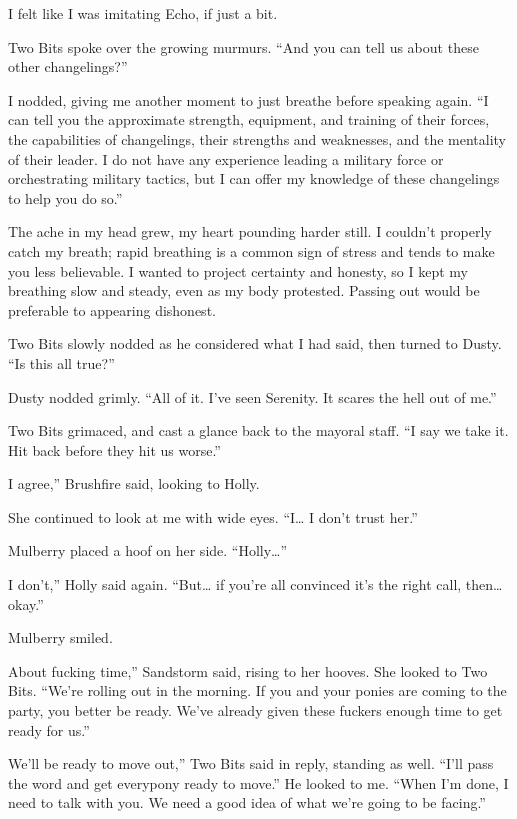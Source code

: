 I felt like I was imitating Echo, if just a bit.

Two Bits spoke over the growing murmurs. “And you can tell us about these other changelings?”

I nodded, giving me another moment to just breathe before speaking again. “I can tell you the approximate strength, equipment, and training of their forces, the capabilities of changelings, their strengths and weaknesses, and the mentality of their leader. I do not have any experience leading a military force or orchestrating military tactics, but I can offer my knowledge of these changelings to help you do so.”

The ache in my head grew, my heart pounding harder still. I couldn’t properly catch my breath; rapid breathing is a common sign of stress and tends to make you less believable. I wanted to project certainty and honesty, so I kept my breathing slow and steady, even as my body protested. Passing out would be preferable to appearing dishonest.

Two Bits slowly nodded as he considered what I had said, then turned to Dusty. “Is this all true?”

Dusty nodded grimly. “All of it. I’ve seen Serenity. It scares the hell out of me.”

Two Bits grimaced, and cast a glance back to the mayoral staff. “I say we take it. Hit back before they hit us worse.”

\leavevmode{}I agree,” Brushfire said, looking to Holly.

She continued to look at me with wide eyes. “I… I don’t trust her.”

Mulberry placed a hoof on her side. “Holly…”

\leavevmode{}I don’t,” Holly said again. “But… if you’re all convinced it’s the right call, then… okay.”

Mulberry smiled.

\leavevmode{}About fucking time,” Sandstorm said, rising to her hooves. She looked to Two Bits. “We’re rolling out in the morning. If you and your ponies are coming to the party, you better be ready. We’ve already given these fuckers enough time to get ready for us.”

\leavevmode{}We’ll be ready to move out,” Two Bits said in reply, standing as well. “I’ll pass the word and get everypony ready to move.” He looked to me. “When I’m done, I need to talk with you. We need a good idea of what we’re going to be facing.”

